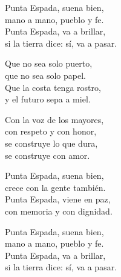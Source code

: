 \begin{lyrics}
Punta Espada, suena bien,\\
mano a mano, pueblo y fe.\\
Punta Espada, va a brillar,\\
si la tierra dice: sí, va a pasar.

Que no sea solo puerto,\\
que no sea solo papel.\\
Que la costa tenga rostro,\\
y el futuro sepa a miel.

Con la voz de los mayores,\\
con respeto y con honor,\\
se construye lo que dura,\\
se construye con amor.

Punta Espada, suena bien,\\
crece con la gente también.\\
Punta Espada, viene en paz,\\
con memoria y con dignidad.

Punta Espada, suena bien,\\
mano a mano, pueblo y fe.\\
Punta Espada, va a brillar,\\
si la tierra dice: sí, va a pasar.
\end{lyrics}

